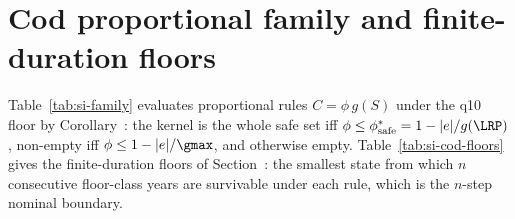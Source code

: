 \section{Cod proportional family and finite-duration floors}\label{si:cod-family}
Table~\ref{tab:si-family} evaluates proportional rules $C=\phi\,g(S)$ under the q10 floor by Corollary~: the kernel is the whole safe set iff $\phi\le\phi^*_{\mathrm{safe}}=1-|e|/g(\LRP)$, non-empty iff $\phi\le1-|e|/\gmax$, and otherwise empty. Table~\ref{tab:si-cod-floors} gives the finite-duration floors of Section~: the smallest state from which $n$ consecutive floor-class years are survivable under each rule, which is the $n$-step nominal boundary.


